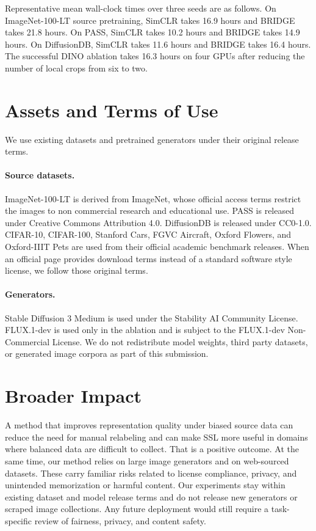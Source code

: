 \documentclass{article}
\begin{document}
Representative mean wall-clock times over three seeds are as follows. On ImageNet-100-LT source pretraining, SimCLR takes 16.9 hours and BRIDGE takes 21.8 hours. On PASS, SimCLR takes 10.2 hours and BRIDGE takes 14.9 hours. On DiffusionDB, SimCLR takes 11.6 hours and BRIDGE takes 16.4 hours. The successful DINO ablation takes 16.3 hours on four GPUs after reducing the number of local crops from six to two.

\section{Assets and Terms of Use}
\label{app:assets}
We use existing datasets and pretrained generators under their original release terms.

\paragraph{Source datasets.}
ImageNet-100-LT is derived from ImageNet, whose official access terms restrict the images to non commercial research and educational use. PASS is released under Creative Commons Attribution 4.0. DiffusionDB is released under CC0-1.0. CIFAR-10, CIFAR-100, Stanford Cars, FGVC Aircraft, Oxford Flowers, and Oxford-IIIT Pets are used from their official academic benchmark releases. When an official page provides download terms instead of a standard software style license, we follow those original terms.

\paragraph{Generators.}
Stable Diffusion 3 Medium is used under the Stability AI Community License. FLUX.1-dev is used only in the ablation and is subject to the FLUX.1-dev Non-Commercial License. We do not redistribute model weights, third party datasets, or generated image corpora as part of this submission.

\section{Broader Impact}
\label{app:impact}
A method that improves representation quality under biased source data can reduce the need for manual relabeling and can make SSL more useful in domains where balanced data are difficult to collect. That is a positive outcome. At the same time, our method relies on large image generators and on web-sourced datasets. These carry familiar risks related to license compliance, privacy, and unintended memorization or harmful content. Our experiments stay within existing dataset and model release terms and do not release new generators or scraped image collections. Any future deployment would still require a task-specific review of fairness, privacy, and content safety.
\end{document}
